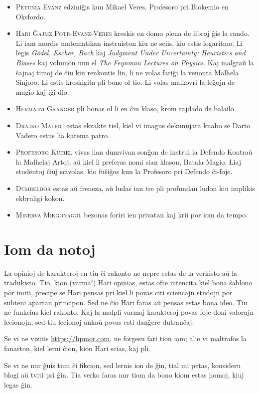 \begin{itemize}
\item \textsc{Petunia Evanz} edziniĝis kun Mikael Veres, Profesoro pri Biokemio en Oksfordo.
\item \textsc{Hari Ĝajmz Potr-Evanz-Veres} kreskis en domo plena de libroj ĝis la rando. Li iam mordis matematikan instruiston kiu ne sciis, kio estis logaritmo. Li legis \emph{Gödel, Escher, Bach} kaj \emph{Judgment Under Uncertainty: Heuristics and Biases} kaj volumon unu el \emph{The Feynman Lectures on Physics}. Kaj malgraŭ la ŝajnaj timoj de ĉiu kiu renkontis lin, li ne volas fariĝi la venonta Malhela Sinjoro. Li estis kreskigita pli bone ol tio. Li volas malkovri la leĝojn de magio kaj iĝi dio.
\item \textsc{Hermajni Granger} pli bonas ol li en ĉiu klaso, krom rajdado de balailo.
\item \textsc{Drajko Malfoj} estas ekzakte tiel, kiel vi imagus dekunujara knabo se Darto Vadero estus lia karema patro.
\item \textsc{Profesoro Kŭirel} vivas lian dumvivan sonĝon de instrui la Defendo Kontraŭ la Malhelaj Artoj, aŭ kiel li preferas nomi sian klason, Batala Magio. Liaj studentoj ĉiuj scivolas, kio fuŝiĝos kun la Profesoro pri Defendo ĉi-foje.
\item \textsc{Dumbeldor} estas aŭ freneza, aŭ ludas ian tre pli profundan ludon kiu implikis ekbruligi kokon.
\item \textsc{Minerva Mikgonagol} bezonas foriri ien privatan kaj krii por iom da tempo.
\end{itemize}

%
%

\section*{Iom da notoj}
La opinioj de karakteroj en tiu ĉi rakonto ne nepre estas de la verkisto aŭ la tradukisto. Tio, kion (varma!) Hari opinias, estas ofte intencita kiel bona ŝablono por imiti, precipe se Hari pensas pri kiel li povas citi sciencajn studojn por subteni apartan principon. Sed ne ĉio Hari faras aŭ pensas estas bona ideo. Tiu ne funkcius kiel rakonto. Kaj la malpli varmaj karakteroj povas foje doni valorajn lecionojn, sed tiu lecionoj ankaŭ povas esti danĝere dutranĉaj.

Se vi ne vizitis \url{https://hpmor.com}, ne forgesu fari tion iam; alie vi maltrafos la fanarton, kiel lerni ĉion, kion Hari scias, kaj pli.

Se vi ne nur ĝuis tiun ĉi fikcion, sed lernis ion de ĝin, tial mi petas, konsideru blogi aŭ tviti pri ĝin. Tia verko faras nur tiom da bono kiom estas homoj, kiuj legas ĝin.

